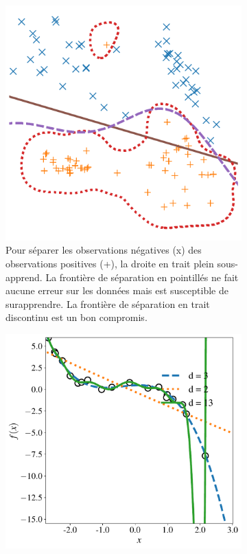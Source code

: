 \begin{figure}[h]
  \begin{subfigure}[t]{0.48\textwidth}
    \centering
    \includegraphics[width=\textwidth]{figures/generalisation/overfit_class}
    \caption{Pour séparer les observations négatives (x) des observations
      positives (+), la droite en trait plein sous-apprend. La frontière de
      séparation en pointillés ne fait aucune erreur sur les données mais est
      susceptible de surapprendre. La frontière de séparation en trait
      discontinu est un bon compromis.}
    \label{fig:overfit_class}
  \end{subfigure}
  \hfill
  \begin{subfigure}[t]{0.48\textwidth}
    \centering
    \includegraphics[width=\textwidth]{figures/generalisation/overfit_regr}

\end{subfigure}
\end{figure}
